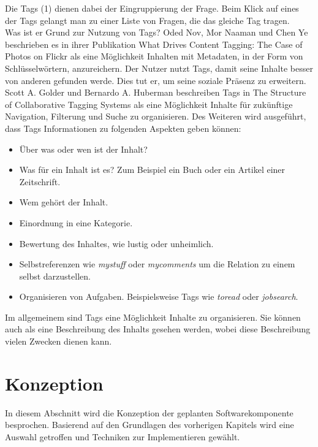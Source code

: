 \documentclass[a4paper]{article}
\begin{document}
	Die Tags (1) dienen dabei der Eingruppierung der Frage. Beim Klick auf eines
	der Tags gelangt man zu einer Liste von Fragen, die das gleiche Tag tragen. \\
	
	Was ist er Grund zur Nutzung von Tags? Oded Nov, Mor Naaman und Chen Ye
	beschrieben es in ihrer Publikation What Drives Content Tagging: The Case of
	Photos on Flickr \cite{CaseTag} als eine Möglichkeit Inhalten mit Metadaten,
	in der Form von Schlüsselwörtern, anzureichern. Der Nutzer nutzt Tags, damit
	seine Inhalte besser von anderen gefunden werde. Dies tut er, um seine soziale
	Präsenz zu erweitern. Scott A. Golder und Bernardo A. Huberman beschreiben Tags 
	in The Structure of Collaborative Tagging Systems \cite{CollTag} als eine
	Möglichkeit Inhalte für zukünftige Navigation, Filterung und Suche zu
	organisieren. Des Weiteren wird ausgeführt, dass Tags Informationen zu folgenden
	Aspekten geben können:
	
	\begin{itemize}
		\item Über was oder wen ist der Inhalt?
		\item Was für ein Inhalt ist es? Zum Beispiel ein Buch oder ein Artikel
		einer Zeitschrift.
		\item Wem gehört der Inhalt.
		\item Einordnung in eine Kategorie.
		\item Bewertung des Inhaltes, wie lustig oder unheimlich.
		\item Selbstreferenzen wie \emph{mystuff} oder \emph{mycomments}
		um die Relation zu einem selbst darzustellen.
		\item Organisieren von Aufgaben. Beispielsweise Tags wie \emph{toread} oder
		\emph{jobsearch}.
	\end{itemize}
	
	Im allgemeinem sind Tags eine Möglichkeit Inhalte zu organisieren. Sie können
	auch als eine Beschreibung des Inhalts gesehen werden, wobei diese Beschreibung
	vielen Zwecken dienen kann.
		
	\newpage
	
	\section{Konzeption}	
	
	In diesem Abschnitt wird die Konzeption der geplanten Softwarekomponente
	besprochen. Basierend auf den Grundlagen des vorherigen Kapitels wird eine
	Auswahl getroffen und Techniken zur Implementieren gewählt.
	
\end{document}
